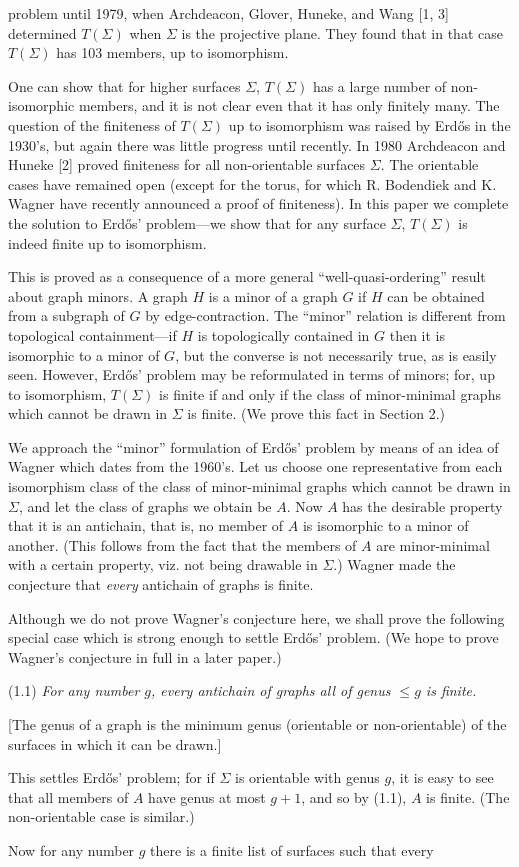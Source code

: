 \noindent problem until 1979, when Archdeacon, Glover, Huneke, and Wang [1, 3] determined $T(\Sigma)$ when $\Sigma$ is the projective plane. They found that in that case $T(\Sigma)$ has 103 members, up to isomorphism.

One can show that for higher surfaces $\Sigma$, $T(\Sigma)$ has a large number of non-isomorphic members, and it is not clear even that it has only finitely many. The question of the finiteness of $T(\Sigma)$ up to isomorphism was raised by Erd\H{o}s in the 1930's, but again there was little progress until recently. In 1980 Archdeacon and Huneke [2] proved finiteness for all non-orientable surfaces $\Sigma$. The orientable cases have remained open (except for the torus, for which R. Bodendiek and K. Wagner have recently announced a proof of finiteness). In this paper we complete the solution to Erd\H{o}s' problem---we show that for any surface $\Sigma$, $T(\Sigma)$ is indeed finite up to isomorphism.

This is proved as a consequence of a more general ``well-quasi-ordering'' result about graph minors. A graph $H$ is a minor of a graph $G$ if $H$ can be obtained from a subgraph of $G$ by edge-contraction. The ``minor'' relation is different from topological containment---if $H$ is topologically contained in $G$ then it is isomorphic to a minor of $G$, but the converse is not necessarily true, as is easily seen. However, Erd\H{o}s' problem may be reformulated in terms of minors; for, up to isomorphism, $T(\Sigma)$ is finite if and only if the class of minor-minimal graphs which cannot be drawn in $\Sigma$ is finite. (We prove this fact in Section 2.)

We approach the ``minor'' formulation of Erd\H{o}s' problem by means of an idea of Wagner which dates from the 1960's. Let us choose one representative from each isomorphism class of the class of minor-minimal graphs which cannot be drawn in $\Sigma$, and let the class of graphs we obtain be $A$. Now $A$ has the desirable property that it is an antichain, that is, no member of $A$ is isomorphic to a minor of another. (This follows from the fact that the members of $A$ are minor-minimal with a certain property, viz. not being drawable in $\Sigma$.) Wagner made the conjecture that \textit{every} antichain of graphs is finite.

Although we do not prove Wagner's conjecture here, we shall prove the following special case which is strong enough to settle Erd\H{o}s' problem. (We hope to prove Wagner's conjecture in full in a later paper.)

\stmt
(1.1) \textit{For any number $g$, every antichain of graphs all of genus $\le g$ is finite.}

[The genus of a graph is the minimum genus (orientable or non-orientable) of the surfaces in which it can be drawn.]

This settles Erd\H{o}s' problem; for if $\Sigma$ is orientable with genus $g$, it is easy to see that all members of $A$ have genus at most $g+1$, and so by (1.1), $A$ is finite. (The non-orientable case is similar.)

Now for any number $g$ there is a finite list of surfaces such that every
